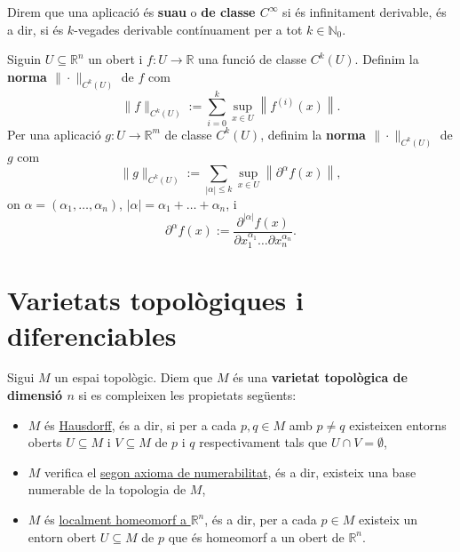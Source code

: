 \begin{defi}
    Direm que una aplicació és \textbf{suau} o \textbf{de classe $C^\infty$} si és infinitament derivable, és a dir, si és $k$-vegades derivable contínuament per a tot $k\in\mathbb N_0$.
\end{defi}

\begin{defi}
    
    Siguin $U\subseteq \mathbb R^n$ un obert i $f:U\to\mathbb R$ una funció de classe $C^k(U)$. Definim la \textbf{norma $\|\cdot\|_{C^k(U)}$} de $f$ com
    \begin{equation*}
        \|f\|_{C^k(U)} := \sum_{i = 0}^k \sup_{x\in U} \left\| f^{(i)}(x) \right\|.
    \end{equation*}
    Per una aplicació $g:U\to\mathbb{R}^m$ de classe $C^k(U)$, definim la \textbf{norma $\|\cdot\|_{C^k(U)}$} de $g$ com
    \begin{equation*}
        \|g\|_{C^k(U)} := \sum_{|\alpha| \leq k} \sup_{x\in U} \left\| \partial^\alpha f(x) \right\|,
    \end{equation*}
    on $\alpha = (\alpha_1, \dots, \alpha_n)$, $|\alpha| = \alpha_1 + \dots + \alpha_n$, i
    \[
    \partial^\alpha f(x) := \frac{\partial^{|\alpha|} f(x)}{\partial x_1^{\alpha_1} \dots \partial x_n^{\alpha_n}}.
    \]
\end{defi}

\section{Varietats topològiques i diferenciables}
\begin{defi} 
    Sigui $M$ un espai topològic. Diem que $M$ és una \textbf{varietat topològica de dimensió $n$} si es compleixen les propietats següents:
    \begin{itemize}
        \item $M$ és \underline{Hausdorff}, és a dir, si per a cada $p,q\in M$ amb $p\neq q$ existeixen entorns oberts $U\subseteq M$ i $V\subseteq M$ de $p$ i $q$ respectivament tals que $U\cap V = \emptyset$,
        \item $M$ verifica el \underline{segon axioma de numerabilitat}, és a dir, existeix una base numerable de la topologia de $M$,
        \item $M$ és \underline{localment homeomorf a $\mathbb R^n$}, és a dir, per a cada $p\in M$ existeix un entorn obert $U\subseteq M$ de $p$ que és homeomorf a un obert de $\mathbb R^n$.
    \end{itemize}
\end{defi}

